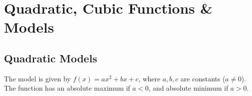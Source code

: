 \documentclass[notes]{subfiles}
\begin{document}
	\fancyhead[LO,RE]{\bfseries \currentname}
	\fancyfoot[C]{{}}
	\fancyfoot[RO,LE]{\large \thepage}	%


\section*{Quadratic, Cubic Functions \& Models}\label{cs19111}
	\subsection*{Quadratic Models}
		The model is given by $f(x) = ax^2 + bx + c$, where $a,b,c$ are constants ($a\neq 0$).  The function has an absolute maximum if $a < 0$, and absolute minimum if $a > 0$.
\end{document}

